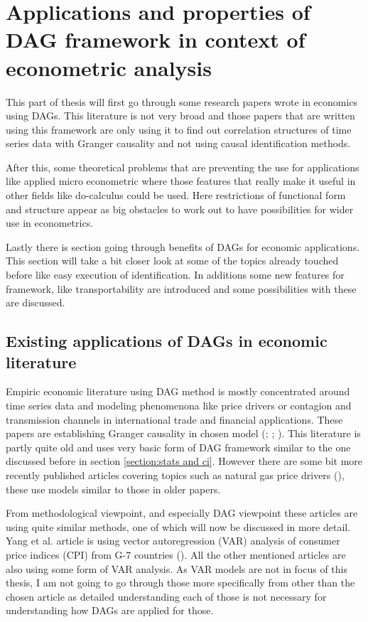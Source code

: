 \documentclass[main=english,12pt,a4paper,pdftex,econ,utf8]{aaltothesis}
\begin{document}
\clearpage

\section{Applications and properties of DAG framework in context of econometric analysis} \label{section:economics}

This part of thesis will first go through some research papers wrote in economics using DAGs. This literature is not very broad and those papers that are written using this framework are only using it to find out correlation structures of time series data with Granger causality and not using causal identification methods.

After this, some theoretical problems that are preventing the use for applications like applied micro econometric where those features that really make it useful in other fields like do-calculus could be used. Here restrictions of functional form and structure appear as big obstacles to work out to have possibilities for wider use in econometrics.

Lastly there is section going through benefits of DAGs for economic applications. This section will take a bit closer look at some of the topics already touched before like easy execution of identification. In additions some new features for framework, like transportability are introduced and some possibilities with these are discussed.

\subsection{Existing applications of DAGs in economic literature}

Empiric economic literature using DAG method is mostly concentrated around time series data and modeling phenomenona like price drivers or contagion and transmission channels in international trade and financial applications. These papers are establishing Granger causality in chosen model (\cite{Awokuse2003}; \cite{Bessler2003}; \cite{Yang2006}). This literature is partly quite old and uses very basic form of DAG framework similar to the one discussed before in section \ref{section:stats and ci}. However there are some bit more recently published articles covering topics such as natural gas price drivers (\cite{Ji2018}), these use models similar to those in older papers.

From methodological viewpoint, and especially DAG viewpoint these articles are using quite similar methods, one of which will now be discussed in more detail. Yang et al. article is using vector autoregression (VAR) analysis of consumer price indices (CPI) from G-7 countries (\cite{Yang2006}). All the other mentioned articles are also using some form of VAR analysis. As VAR models are not in focus of this thesis, I am not going to go through those more specifically from other than the chosen article as detailed understanding each of those is not necessary for understanding how DAGs are applied for those.
\end{document}
